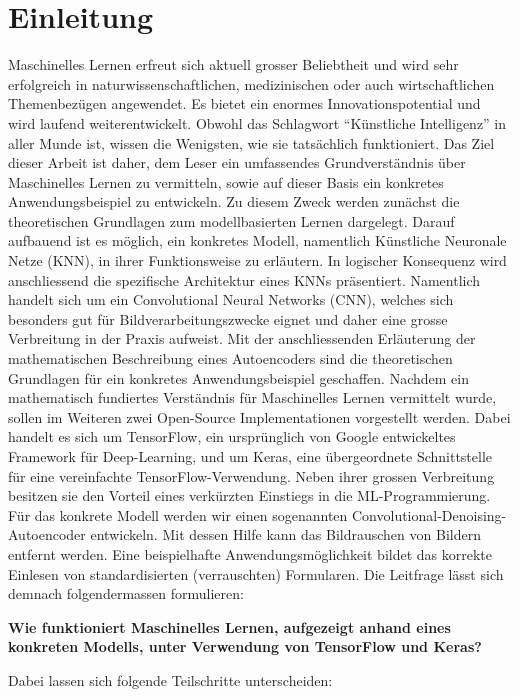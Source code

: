 \chapter*{Einleitung}
Maschinelles Lernen erfreut sich aktuell grosser Beliebtheit und wird
sehr erfolgreich in naturwissenschaftlichen, medizinischen oder auch
wirtschaftlichen Themenbezügen angewendet. Es bietet ein enormes
Innovationspotential und wird laufend weiterentwickelt.
Obwohl das Schlagwort ``Künstliche Intelligenz'' in aller Munde ist, wissen die
Wenigsten, wie sie tatsächlich funktioniert.
\para{}
Das Ziel dieser Arbeit ist daher, dem Leser ein umfassendes Grundverständnis
über Maschinelles Lernen zu vermitteln, sowie auf dieser Basis ein konkretes
Anwendungsbeispiel zu entwickeln. Zu diesem Zweck werden zunächst die
theoretischen Grundlagen zum modellbasierten Lernen dargelegt. Darauf aufbauend
ist es möglich, ein konkretes Modell, namentlich Künstliche Neuronale Netze
(KNN), in
ihrer Funktionsweise zu erläutern. In logischer Konsequenz wird anschliessend
die spezifische Architektur eines KNNs präsentiert. Namentlich handelt sich um
ein Convolutional Neural Networks (CNN), welches sich besonders gut für
Bildverarbeitungszwecke eignet und daher eine grosse Verbreitung in der Praxis aufweist.
Mit der anschliessenden Erläuterung der mathematischen Beschreibung eines Autoencoders sind
die theoretischen Grundlagen für ein konkretes Anwendungsbeispiel geschaffen.
\para{}
Nachdem ein mathematisch fundiertes Verständnis für Maschinelles Lernen
vermittelt wurde, sollen im Weiteren zwei Open-Source Implementationen vorgestellt
werden. Dabei handelt es sich um TensorFlow, ein ursprünglich von Google
entwickeltes Framework für Deep-Learning, und um Keras, eine übergeordnete
Schnittstelle für eine vereinfachte TensorFlow-Verwendung. Neben ihrer grossen
Verbreitung besitzen sie den Vorteil eines verkürzten Einstiegs in die
ML-Programmierung.
\para{}
Für das konkrete Modell werden wir einen sogenannten
Convolutional-Denoising-Autoencoder entwickeln. Mit dessen Hilfe kann das
Bildrauschen von Bildern entfernt werden. Eine beispielhafte
Anwendungsmöglichkeit bildet das korrekte Einlesen von standardisierten (verrauschten) Formularen.
\para{}
Die Leitfrage lässt sich demnach folgendermassen formulieren:
\begin{center}
 \textbf{Wie funktioniert Maschinelles Lernen, aufgezeigt anhand eines konkreten
   Modells, unter Verwendung von TensorFlow und Keras?}
\end{center}
\para{}
Dabei lassen sich folgende Teilschritte unterscheiden:
